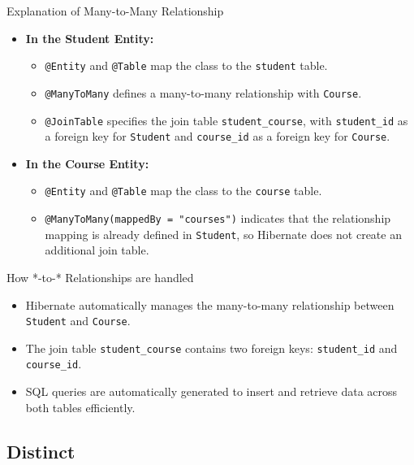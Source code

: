\documentclass[aspectratio=169, table]{beamer}
\begin{document}
\begin{frame}{Explanation of Many-to-Many Relationship}
	\vspace{20pt}
	\begin{itemize}
		\item \textbf{In the Student Entity:}
		\begin{itemize}
			\item \texttt{@Entity} and \texttt{@Table} map the class to the \texttt{student} table.
			\item \texttt{@ManyToMany} defines a many-to-many relationship with \texttt{Course}.
			\item \texttt{@JoinTable} specifies the join table \texttt{student\_course}, with \texttt{student\_id} as a foreign key for \texttt{Student} and \texttt{course\_id} as a foreign key for \texttt{Course}.
		\end{itemize}
		\item \textbf{In the Course Entity:}
		\begin{itemize}
			\item \texttt{@Entity} and \texttt{@Table} map the class to the \texttt{course} table.
			\item \texttt{@ManyToMany(mappedBy = "courses")} indicates that the relationship mapping is already defined in \texttt{Student}, so Hibernate does not create an additional join table.
		\end{itemize}
	\end{itemize}
\end{frame}

\begin{frame}{How *-to-* Relationships are handled}
	\vspace{20pt}
	\begin{itemize}
		\item Hibernate automatically manages the many-to-many relationship between \texttt{Student} and \texttt{Course}.
		\item The join table \texttt{student\_course} contains two foreign keys: \texttt{student\_id} and \texttt{course\_id}.
		\item SQL queries are automatically generated to insert and retrieve data across both tables efficiently.
	\end{itemize}
\end{frame}


\subsection{Distinct}
\end{document}
